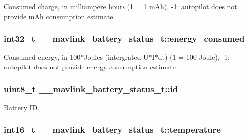 Consumed charge, in milliampere hours (1 = 1 m\+Ah), -\/1\+: autopilot does not provide m\+Ah consumption estimate. 

\hypertarget{struct____mavlink__battery__status__t_a533f5606ec2f20a4ac4ff74b2e81f3b8}{
\subsubsection[{energy\+\_\+consumed}]{\setlength{\rightskip}{0pt plus 5cm}int32\+\_\+t \+\_\+\+\_\+mavlink\+\_\+battery\+\_\+status\+\_\+t\+::energy\+\_\+consumed}}\label{struct____mavlink__battery__status__t_a533f5606ec2f20a4ac4ff74b2e81f3b8}


Consumed energy, in 100$\ast$\+Joules (intergrated U$\ast$\+I$\ast$dt) (1 = 100 Joule), -\/1\+: autopilot does not provide energy consumption estimate. 

\hypertarget{struct____mavlink__battery__status__t_a206a47f6c36d68742a1fa6c1e9fcc475}{
\subsubsection[{id}]{\setlength{\rightskip}{0pt plus 5cm}uint8\+\_\+t \+\_\+\+\_\+mavlink\+\_\+battery\+\_\+status\+\_\+t\+::id}}\label{struct____mavlink__battery__status__t_a206a47f6c36d68742a1fa6c1e9fcc475}


Battery I\+D. 

\hypertarget{struct____mavlink__battery__status__t_a201acfc9b1f55193779a17fe758b88a6}{
\subsubsection[{temperature}]{\setlength{\rightskip}{0pt plus 5cm}int16\+\_\+t \+\_\+\+\_\+mavlink\+\_\+battery\+\_\+status\+\_\+t\+::temperature}}\label{struct____mavlink__battery__status__t_a201acfc9b1f55193779a17fe758b88a6}


